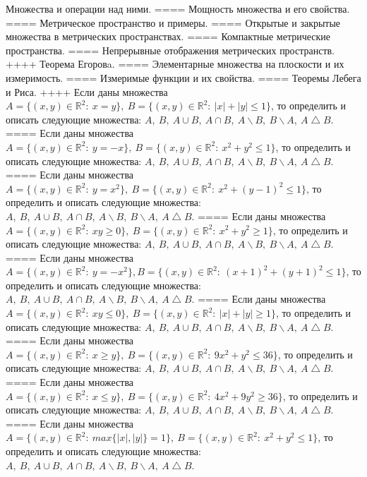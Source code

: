 Множества и операции над ними.
====
Мощность множества и его свойства.
====
Метрическое пространство и примеры.
====
Открытые и закрытые множества в метрических пространствах.
====
Компактные метрические пространства.
====
Непрерывные отображения метрических пространств.
++++
Теорема Егоровa.
====
Элементарные множества на плоскости и их измеримость.
====
Измеримые функции и их свойства.
====
Теоремы Лебега и Риса.
++++
Если даны множества \(A = \{(x,y) \in \mathbb{R}^{2}:\ x = y\},\ B = \{(x,y) \in \mathbb{R}^{2}:\ |x| + |y| \leq 1\}\), то определить и описать следующие множества: \(A,\ B,\ A \cup B,\ A \cap B,\ A \backslash B,\ B \backslash A,\ A \bigtriangleup B\).
====
Если даны множества \(A = \{(x,y) \in \mathbb{R}^{2}:\ y = - x\},\ B = \{(x,y) \in \mathbb{R}^{2}:\ x^{2} + y^{2} \leq 1\}\), то определить и описать следующие множества: \(A,\ B,\ A \cup B,\ A \cap B,\ A \backslash B,\ B \backslash A,\ A \bigtriangleup B\).
====
Если даны множества \(A = \{(x,y) \in \mathbb{R}^{2}:\ y = x^{2}\},\ B = \{(x,y) \in \mathbb{R}^{2}:\ x^{2} + (y - 1)^{2} \leq 1\}\), то определить и описать следующие множества: \(A,\ B,\ A \cup B,\ A \cap B,\ A \backslash B,\ B \backslash A,\ A \bigtriangleup B\).
====
Если даны множества \(A = \{(x,y) \in \mathbb{R}^{2}:\ xy \geq 0\},\ B = \{(x,y) \in \mathbb{R}^{2}:\ x^{2} + y^{2} \geq 1\}\), то определить и описать следующие множества: \(A,\ B,\ A \cup B,\ A \cap B,\ A \backslash B,\ B \backslash A,\ A \bigtriangleup B\).
====
Если даны множества \(A = \{(x,y) \in \mathbb{R}^{2}:\ y = - x^{2}\},B = \{(x,y) \in \mathbb{R}^{2}:\ (x + 1)^{2} + (y + 1)^{2} \leq 1\}\), то определить и описать следующие множества: \(A,\ B,\ A \cup B,\ A \cap B,\ A \backslash B,\ B \backslash A,\ A \bigtriangleup B\).
====
Если даны множества \(A = \{(x,y) \in \mathbb{R}^{2}:\ xy \leq 0\},\ B = \{(x,y) \in \mathbb{R}^{2}:\ |x| + |y| \geq 1\}\), то определить и описать следующие множества: \(A,\ B,\ A \cup B,\ A \cap B,\ A \backslash B,\ B \backslash A,\ A \bigtriangleup B\).
====
Если даны множества \(A = \{(x,y) \in \mathbb{R}^{2}:\ x \geq y\},\ B = \{(x,y) \in \mathbb{R}^{2}:\ 9x^{2} + y^{2} \leq 36\}\), то определить и описать следующие множества: \(A,\ B,\ A \cup B,\ A \cap B,\ A \backslash B,\ B \backslash A,\ A \bigtriangleup B\).
====
Если даны множества \(A = \{(x,y) \in \mathbb{R}^{2}:\ x \leq y\},\ B = \{(x,y) \in \mathbb{R}^{2}:\ 4x^{2} + 9y^{2} \geq 36\}\), то определить и описать следующие множества: \(A,\ B,\ A \cup B,\ A \cap B,\ A \backslash B,\ B \backslash A,\ A \bigtriangleup B\).
====
Если даны множества \(A = \{(x,y) \in \mathbb{R}^{2}:\ max\{|x|,|y|\} = 1\},\ B = \{(x,y) \in \mathbb{R}^{2}:\ x^{2} + y^{2} \leq 1\}\), то определить и описать следующие множества: \(A,\ B,\ A \cup B,\ A \cap B,\ A \backslash B,\ B \backslash A,\ A \bigtriangleup B\).
